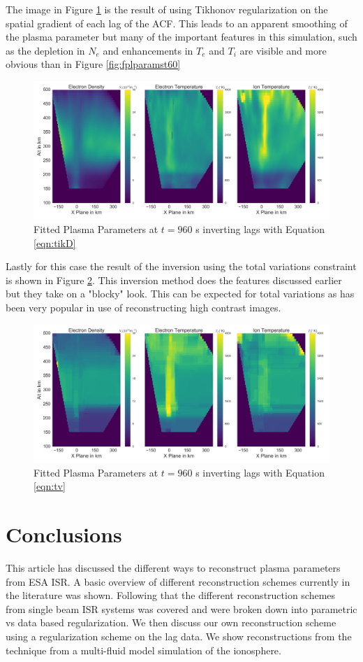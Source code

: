 The image in Figure \ref{fig:tikD} is the result of using Tikhonov regularization on the spatial gradient of each lag of the ACF. This leads to an apparent smoothing of the plasma parameter but many of the important features in this simulation, such as the depletion in $N_e$ and enhancements in $T_e$ and $T_i$ are visible and more obvious than in Figure \ref{fig:fplparamst60}
\begin{figure}[!ht]
\centering
\includegraphics[width=6in]{tikdfitted}
\caption{Fitted Plasma Parameters at $t=960$ s inverting lags with Equation \ref{eqn:tikD}}
\label{fig:tikD}
\end{figure}

Lastly for this case the result of the inversion using the total variations constraint is shown in Figure \ref{fig:tv}. This inversion method does the features discussed earlier but they take on a "blocky" look. This can be expected for total variations as has been very popular in use of reconstructing high contrast images\cite{Karl:2005jy}.
\begin{figure}[!ht]
\centering
\includegraphics[width=6in]{tvfitted}
\caption{Fitted Plasma Parameters at $t=960$ s inverting lags with Equation \ref{eqn:tv}}
\label{fig:tv}
\end{figure}

\section{Conclusions}

This article has discussed the different ways to reconstruct plasma parameters from ESA ISR. A basic overview of different reconstruction schemes currently in the literature was shown. Following that the different reconstruction schemes from single beam ISR systems was covered and were broken down into parametric vs data based regularization. We then discuss our own reconstruction scheme using a regularization scheme on the lag data. We show reconstructions from the technique from a multi-fluid model simulation of the ionosphere.
